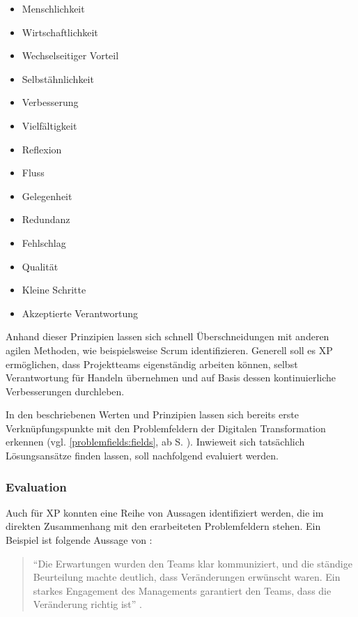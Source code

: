 \begin{itemize}[noitemsep, topsep=0pt]
	\item Menschlichkeit
	\item Wirtschaftlichkeit
	\item Wechselseitiger Vorteil
	\item Selbstähnlichkeit
	\item Verbesserung
	\item Vielfältigkeit
	\item Reflexion
	\item Fluss
	\item Gelegenheit
	\item Redundanz
	\item Fehlschlag
	\item Qualität
	\item Kleine Schritte
	\item Akzeptierte Verantwortung
\end{itemize}

Anhand dieser Prinzipien lassen sich schnell Überschneidungen mit anderen agilen Methoden, wie beispielsweise Scrum identifizieren. Generell soll es XP ermöglichen, dass Projektteams eigenständig arbeiten können, selbst Verantwortung für Handeln übernehmen und auf Basis dessen kontinuierliche Verbesserungen durchleben.

In den beschriebenen Werten und Prinzipien lassen sich bereits erste Verknüpfungspunkte mit den Problemfeldern der Digitalen Transformation erkennen (vgl. \ref{problemfields:fields}, ab S. \pageref{problemfields:fields}). Inwieweit sich tatsächlich Lösungsansätze finden lassen, soll nachfolgend evaluiert werden.

\subsubsection{Evaluation}

Auch für XP konnten eine Reihe von Aussagen identifiziert werden, die im direkten Zusammenhang mit den erarbeiteten Problemfeldern stehen. Ein Beispiel ist folgende Aussage von :

\begin{quote}
	``Die Erwartungen wurden den Teams klar kommuniziert, und die ständige Beurteilung machte deutlich, dass Veränderungen erwünscht waren. Ein starkes Engagement des Managements garantiert den Teams, dass die Veränderung richtig ist'' \cite[S. 15]{dikert_challenges_2016}.
\end{quote}


